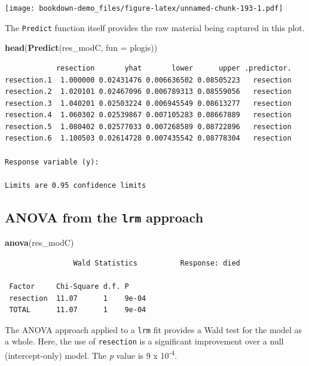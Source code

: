 \documentclass[]{book}
\newenvironment{Shaded}{\begin{snugshade}}{\end{snugshade}}
\newcommand{\KeywordTok}[1]{\textcolor[rgb]{0.13,0.29,0.53}{\textbf{#1}}}
\newcommand{\DataTypeTok}[1]{\textcolor[rgb]{0.13,0.29,0.53}{#1}}
\newcommand{\NormalTok}[1]{#1}
\theoremstyle{definition}
\theoremstyle{definition}
\theoremstyle{definition}
\theoremstyle{remark}
\begin{document}
\texttt{[image: bookdown-demo\_files/figure-latex/unnamed-chunk-193-1.pdf]}

The \texttt{Predict} function itself provides the raw material being
captured in this plot.

\begin{Shaded}
\begin{Highlighting}[]
\KeywordTok{head}\NormalTok{(}\KeywordTok{Predict}\NormalTok{(res_modC, }\DataTypeTok{fun =}\NormalTok{ plogis))}
\end{Highlighting}
\end{Shaded}

\begin{verbatim}
            resection       yhat       lower      upper .predictor.
resection.1  1.000000 0.02431476 0.006636502 0.08505223   resection
resection.2  1.020101 0.02467096 0.006789313 0.08559056   resection
resection.3  1.040201 0.02503224 0.006945549 0.08613277   resection
resection.4  1.060302 0.02539867 0.007105283 0.08667889   resection
resection.5  1.080402 0.02577033 0.007268589 0.08722896   resection
resection.6  1.100503 0.02614728 0.007435542 0.08778304   resection

Response variable (y):  

Limits are 0.95 confidence limits
\end{verbatim}

\subsection{\texorpdfstring{ANOVA from the \texttt{lrm}
approach}{ANOVA from the lrm approach}}\label{anova-from-the-lrm-approach}

\begin{Shaded}
\begin{Highlighting}[]
\KeywordTok{anova}\NormalTok{(res_modC)}
\end{Highlighting}
\end{Shaded}

\begin{verbatim}
                Wald Statistics          Response: died 

 Factor     Chi-Square d.f. P    
 resection  11.07      1    9e-04
 TOTAL      11.07      1    9e-04
\end{verbatim}

The ANOVA approach applied to a \texttt{lrm} fit provides a Wald test
for the model as a whole. Here, the use of \texttt{resection} is a
significant improvement over a null (intercept-only) model. The \emph{p}
value is 9 x 10\textsuperscript{-4}.
\end{document}

